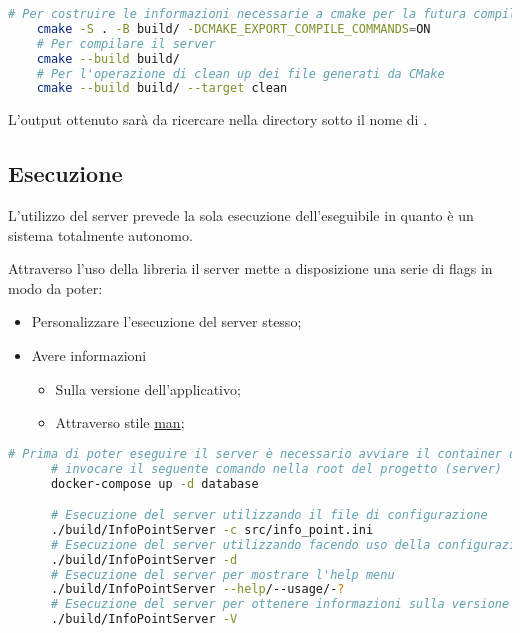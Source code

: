  \begin{lstlisting}[language=bash]
    # Per costruire le informazioni necessarie a cmake per la futura compilazione
    cmake -S . -B build/ -DCMAKE_EXPORT_COMPILE_COMMANDS=ON
    # Per compilare il server
    cmake --build build/
    # Per l'operazione di clean up dei file generati da CMake
    cmake --build build/ --target clean
  \end{lstlisting}

  L'output ottenuto sarà da ricercare nella directory  sotto il nome di  \footnotemark {}.

  \subsection{Esecuzione}
    L'utilizzo del server prevede la sola esecuzione dell'eseguibile in quanto è un sistema totalmente autonomo.

    Attraverso l'uso della libreria  il server mette a disposizione una serie di flags in modo da poter:

    \begin{itemize}
     \item Personalizzare l'esecuzione del server stesso;
     \item Avere informazioni
       \begin{itemize}
         \item Sulla versione dell'applicativo;
         \item Attraverso  stile \href{https://en.wikipedia.org/wiki/Man_page}{man};
       \end{itemize}
    \end{itemize}

    \begin{lstlisting}[language=bash]
      # Prima di poter eseguire il server è necessario avviare il container del database mongodb
      # invocare il seguente comando nella root del progetto (server)
      docker-compose up -d database

      # Esecuzione del server utilizzando il file di configurazione
      ./build/InfoPointServer -c src/info_point.ini
      # Esecuzione del server utilizzando facendo uso della configurazione di default (-d o -use-default-config)
      ./build/InfoPointServer -d
      # Esecuzione del server per mostrare l'help menu
      ./build/InfoPointServer --help/--usage/-?
      # Esecuzione del server per ottenere informazioni sulla versione del server
      ./build/InfoPointServer -V
    \end{lstlisting}

